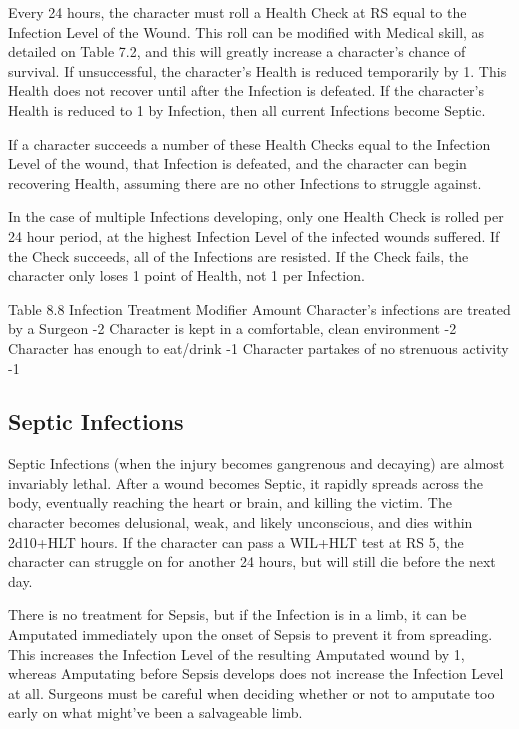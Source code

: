 \documentclass[oneside,11pt,english]{book}
\begin{document}
Every 24 hours, the character must roll a Health Check at RS equal to the Infection Level of the Wound. 
This roll can be modified with Medical skill, as detailed on Table 7.2, and this will greatly increase a 
character’s chance of survival. If unsuccessful, the character’s Health is reduced temporarily by 1. This 
Health does not recover until after the Infection is defeated. If the character’s Health is reduced to 1 by 
Infection, then all current Infections become Septic. 

If a character succeeds a number of these Health Checks equal to the Infection Level of the wound, that 
Infection is defeated, and the character can begin recovering Health, assuming there are no other 
Infections to struggle against. 

In the case of multiple Infections developing, only one Health Check is rolled per 24 hour period, at the 
highest Infection Level of the infected wounds suffered. If the Check succeeds, all of the Infections are 
resisted. If the Check fails, the character only loses 1 point of Health, not 1 per Infection. 

Table 8.8 Infection Treatment
Modifier Amount
Character’s infections are treated by a Surgeon -2 
Character is kept in a comfortable, clean environment -2 
Character has enough to eat/drink -1 
Character partakes of no strenuous activity -1 

\subsection{Septic Infections}
Septic Infections (when the injury becomes gangrenous and decaying) are almost invariably lethal. After 
a wound becomes Septic, it rapidly spreads across the body, eventually reaching the heart or brain, and 
killing the victim. The character becomes delusional, weak, and likely unconscious, and dies within 
2d10+HLT hours. If the character can pass a WIL+HLT test at RS 5, the character can struggle on for 
another 24 hours, but will still die before the next day. 

There is no treatment for Sepsis, but if the Infection is in a limb, it can be Amputated immediately upon 
the onset of Sepsis to prevent it from spreading. This increases the Infection Level of the resulting 
Amputated wound by 1, whereas Amputating before Sepsis develops does not increase the Infection 
Level at all. Surgeons must be careful when deciding whether or not to amputate too early on what 
might’ve been a salvageable limb. 
\end{document}

